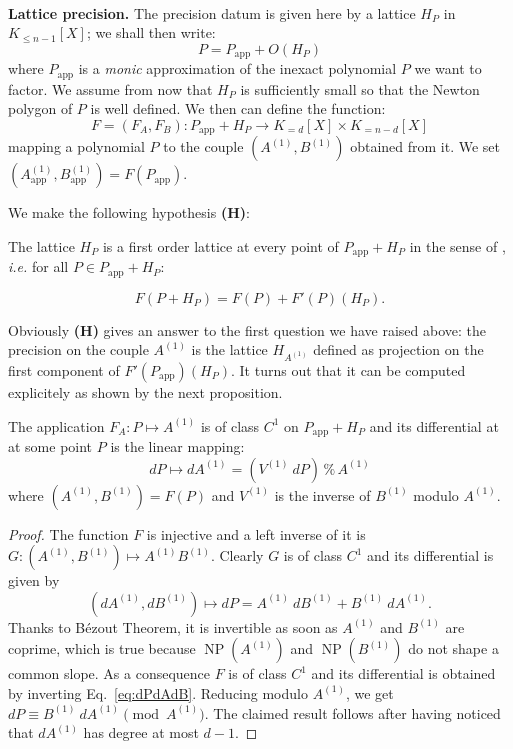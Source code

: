\documentclass{sig-alternate-2013}
\DeclareMathOperator{\NP}{NP}
\renewcommand{\mod}{\,\%\,}
\newcommand{\app}{\textrm{app}}
\def\todo#1{\ \!\!{\color{red} #1}}
\begin{document}
\todo{Answer here the second question.}

\medskip

\noindent
{\bf Lattice precision.}
The precision datum is given here by a lattice $H_P$ in $K_{\leq n{-}1}
[X]$; we shall then write:
$$P = P_\app + O(H_P)$$
where $P_\app$ is a \emph{monic} approximation of the inexact polynomial 
$P$ we want to factor. We assume from now that $H_P$ is sufficiently 
small so that the Newton polygon of $P$ is well defined. We then can
define the function:
$$F = (F_A, F_B) : P_\app + H_P \to K_{=d}[X] \times K_{=n{-}d}[X]$$
mapping a polynomial $P$ to the couple $(A^{(1)}, B^{(1)})$ obtained
from it. We set $(A_\app^{(1)}, B_\app^{(1)}) = F(P_\app)$.

\smallskip

\noindent
We make the following hypothesis \textbf{(H)}:

\smallskip

\noindent
\hfill
\begin{minipage}{8cm}
The lattice $H_P$ is a first order lattice at every point
of $P_\app + H_P$ in the sense of \cite[Definition~3.3]{padicprec},
\emph{i.e.} for all $P \in P_\app + H_P$:

\vspace{-5mm}

$$F(P + H_P) = F(P) + F'(P)(H_P).$$
\end{minipage}
\hfill \null

\bigskip

\noindent
Obviously \textbf{(H)} gives an answer to the first question we have 
raised above: the precision on the couple $A^{(1)}$ is the lattice 
$H_{A^{(1)}}$ defined as projection on the first component of 
$F'(P_\app)(H_P)$. It turns out that it can be computed explicitely as 
shown by the next proposition.

\begin{prop}
\label{prop:precA1}
The application $F_A : P \mapsto A^{(1)}$ is of class $C^1$ on $P_\app + H_P$
and its differential at at some point $P$ is the linear mapping:
$$dP \mapsto dA^{(1)} = (V^{(1)} \: dP) \mod A^{(1)}$$
where $(A^{(1)}, B^{(1)}) = F(P)$ and $V^{(1)}$ is the inverse of 
$B^{(1)}$ modulo $A^{(1)}$.
\end{prop}

\begin{proof}
The function $F$ is injective and a left inverse of it is
$G : (A^{(1)},B^{(1)}) \mapsto A^{(1)}B^{(1)}$.
Clearly $G$ is of class $C^1$ and its differential is given by
\begin{equation}
\label{eq:dPdAdB}
(dA^{(1)}, dB^{(1)}) \mapsto dP = A^{(1)} \: dB^{(1)} + B^{(1)} \: dA^{(1)}.
\end{equation}
Thanks to Bézout Theorem, it is invertible as soon as $A^{(1)}$ and 
$B^{(1)}$ are coprime, which is true because $\NP(A^{(1)})$ and 
$\NP(B^{(1)})$ do not shape a common slope. As a consequence $F$ is of 
class $C^1$ and its differential is obtained by inverting 
Eq.~\eqref{eq:dPdAdB}. Reducing modulo $A^{(1)}$, we get $dP \equiv 
B^{(1)} \: dA^{(1)} \pmod {A^{(1)}}$. The claimed result follows after 
having noticed that $dA^{(1)}$ has degree at most $d{-}1$.
\end{proof}
\end{document}
